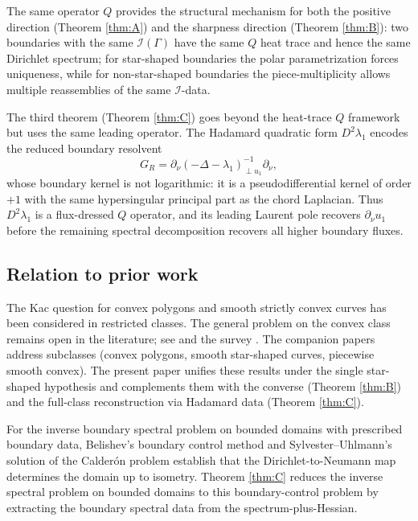 \documentclass[11pt,reqno]{amsart}
\theoremstyle{plain}
\theoremstyle{definition}
\theoremstyle{remark}
\newcommand{\Qop}{Q}
\newcommand{\Icalbb}{\mathcal{I}}
\begin{document}
The same operator $\Qop$ provides the structural mechanism for both the positive direction (Theorem \ref{thm:A}) and the sharpness direction (Theorem \ref{thm:B}): two boundaries with the same $\Icalbb(\Gamma)$ have the same $\Qop$ heat trace and hence the same Dirichlet spectrum; for star-shaped boundaries the polar parametrization forces uniqueness, while for non-star-shaped boundaries the piece-multiplicity allows multiple reassemblies of the same $\Icalbb$-data.

The third theorem (Theorem \ref{thm:C}) goes beyond the heat-trace $\Qop$ framework but uses the same leading operator. The Hadamard quadratic form $D^2\lambda_1$ encodes the reduced boundary resolvent
\[
G_R=\partial_\nu(-\Delta-\lambda_1)^{-1}_{\perp u_1}\partial_\nu,
\]
whose boundary kernel is not logarithmic: it is a pseudodifferential kernel of order $+1$ with the same hypersingular principal part as the chord Laplacian. Thus $D^2\lambda_1$ is a flux-dressed $\Qop$ operator, and its leading Laurent pole recovers $\partial_\nu u_1$ before the remaining spectral decomposition recovers all higher boundary fluxes.

\subsection{Relation to prior work}\label{ss:prior-work}

The Kac question for convex polygons and smooth strictly convex curves has been considered in restricted classes. The general problem on the convex class remains open in the literature; see \cite[\S 1]{LPP-mixed} and the survey \cite{GiraudThas}. The companion papers \cite{GulatiPolygons, GulatiSmooth, GulatiPiecewise} address subclasses (convex polygons, smooth star-shaped curves, piecewise smooth convex). The present paper unifies these results under the single star-shaped hypothesis and complements them with the converse (Theorem \ref{thm:B}) and the full-class reconstruction via Hadamard data (Theorem \ref{thm:C}).

For the inverse boundary spectral problem on bounded domains with prescribed boundary data, Belishev's boundary control method \cite{Belishev} and Sylvester--Uhlmann's solution of the Calderón problem \cite{SylvesterUhlmann} establish that the Dirichlet-to-Neumann map determines the domain up to isometry. Theorem \ref{thm:C} reduces the inverse spectral problem on bounded domains to this boundary-control problem by extracting the boundary spectral data from the spectrum-plus-Hessian.
\end{document}
